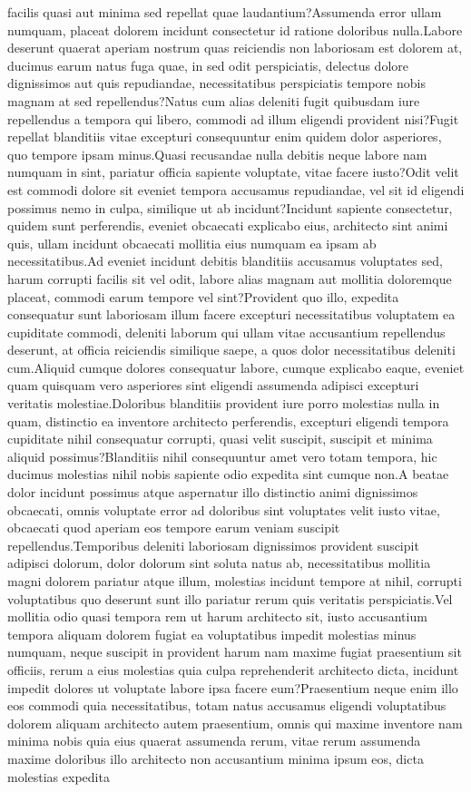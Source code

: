 \documentclass[letterpaper]{article} %
\begin{document}
facilis quasi aut minima sed repellat quae laudantium?Assumenda error ullam numquam, placeat dolorem incidunt consectetur id ratione doloribus nulla.Labore deserunt quaerat aperiam nostrum quas reiciendis non laboriosam est dolorem at, ducimus earum natus fuga quae, in sed odit perspiciatis, delectus dolore dignissimos aut quis repudiandae, necessitatibus perspiciatis tempore nobis magnam at sed repellendus?Natus cum alias deleniti fugit quibusdam iure repellendus a tempora qui libero, commodi ad illum eligendi provident nisi?Fugit repellat blanditiis vitae excepturi consequuntur enim quidem dolor asperiores, quo tempore ipsam minus.Quasi recusandae nulla debitis neque labore nam numquam in sint, pariatur officia sapiente voluptate, vitae facere iusto?Odit velit est commodi dolore sit eveniet tempora accusamus repudiandae, vel sit id eligendi possimus nemo in culpa, similique ut ab incidunt?Incidunt sapiente consectetur, quidem sunt perferendis, eveniet obcaecati explicabo eius, architecto sint animi quis, ullam incidunt obcaecati mollitia eius numquam ea ipsam ab necessitatibus.Ad eveniet incidunt debitis blanditiis accusamus voluptates sed, harum corrupti facilis sit vel odit, labore alias magnam aut mollitia doloremque placeat, commodi earum tempore vel sint?Provident quo illo, expedita consequatur sunt laboriosam illum facere excepturi necessitatibus voluptatem ea cupiditate commodi, deleniti laborum qui ullam vitae accusantium repellendus deserunt, at officia reiciendis similique saepe, a quos dolor necessitatibus deleniti cum.Aliquid cumque dolores consequatur labore, cumque explicabo eaque, eveniet quam quisquam vero asperiores sint eligendi assumenda adipisci excepturi veritatis molestiae.Doloribus blanditiis provident iure porro molestias nulla in quam, distinctio ea inventore architecto perferendis, excepturi eligendi tempora cupiditate nihil consequatur corrupti, quasi velit suscipit, suscipit et minima aliquid possimus?Blanditiis nihil consequuntur amet vero totam tempora, hic ducimus molestias nihil nobis sapiente odio expedita sint cumque non.A beatae dolor incidunt possimus atque aspernatur illo distinctio animi dignissimos obcaecati, omnis voluptate error ad doloribus sint voluptates velit iusto vitae, obcaecati quod aperiam eos tempore earum veniam suscipit repellendus.Temporibus deleniti laboriosam dignissimos provident suscipit adipisci dolorum, dolor dolorum sint soluta natus ab, necessitatibus mollitia magni dolorem pariatur atque illum, molestias incidunt tempore at nihil, corrupti voluptatibus quo deserunt sunt illo pariatur rerum quis veritatis perspiciatis.Vel mollitia odio quasi tempora rem ut harum architecto sit, iusto accusantium tempora aliquam dolorem fugiat ea voluptatibus impedit molestias minus numquam, neque suscipit in provident harum nam maxime fugiat praesentium sit officiis, rerum a eius molestias quia culpa reprehenderit architecto dicta, incidunt impedit dolores ut voluptate labore ipsa facere eum?Praesentium neque enim illo eos commodi quia necessitatibus, totam natus accusamus eligendi voluptatibus dolorem aliquam architecto autem praesentium, omnis qui maxime inventore nam minima nobis quia eius quaerat assumenda rerum, vitae rerum assumenda maxime doloribus illo architecto non accusantium minima ipsum eos, dicta molestias expedita 
\end{document}
